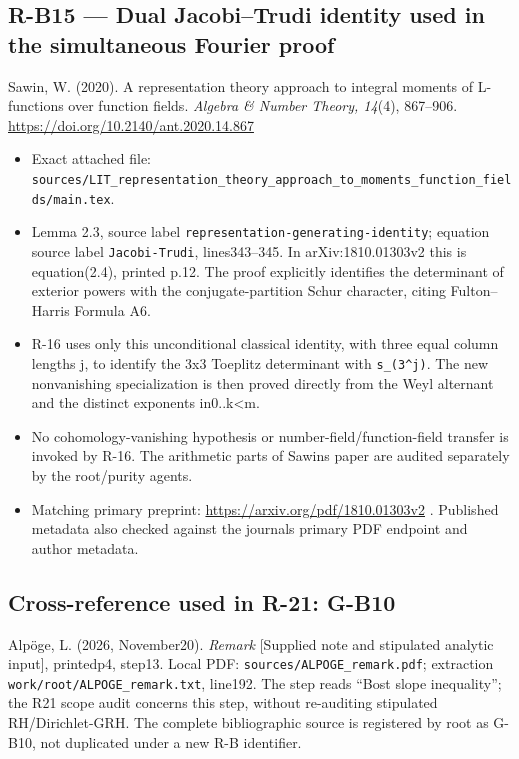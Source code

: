 \documentclass[11pt,a4paper]{article}
\providecommand{\tightlist}{\setlength{\itemsep}{0pt}\setlength{\parskip}{0pt}}
\theoremstyle{definition}\newtheorem{definition}{Definition}
\begin{document}
\subsection{R-B15 --- Dual Jacobi--Trudi identity used in the
simultaneous Fourier
proof}\label{r-b15--dual-jacobitrudi-identity-used-in-the-simultaneous-fourier-proof}

Sawin, W. (2020). A representation theory approach to integral moments
of L-functions over function fields. \emph{Algebra \& Number Theory,
14}(4), 867--906. \url{https://doi.org/10.2140/ant.2020.14.867}

\begin{itemize}
\tightlist
\item
  Exact attached file:
  \nolinkurl{sources/LIT_representation_theory_approach_to_moments_function_fields/main.tex}.
\item
  Lemma 2.3, source label \nolinkurl{representation-generating-identity};
  equation source label \nolinkurl{Jacobi-Trudi}, lines343--345. In
  arXiv:1810.01303v2 this is equation(2.4), printed p.12. The proof
  explicitly identifies the determinant of exterior powers with the
  conjugate-partition Schur character, citing Fulton--Harris Formula A6.
\item
  R-16 uses only this unconditional classical identity, with three equal
  column lengths j, to identify the 3x3 Toeplitz determinant with
  \texttt{s\_(3\^{}j)}. The new nonvanishing specialization is then
  proved directly from the Weyl alternant and the distinct exponents
  in0..k\textless m.
\item
  No cohomology-vanishing hypothesis or number-field/function-field
  transfer is invoked by R-16. The arithmetic parts of
  Sawin\textquotesingle s paper are audited separately by the
  root/purity agents.
\item
  Matching primary preprint: \url{https://arxiv.org/pdf/1810.01303v2} .
  Published metadata also checked against the journal\textquotesingle s
  primary PDF endpoint and author metadata.
\end{itemize}

\subsection{Cross-reference used in R-21:
G-B10}\label{cross-reference-used-in-r-21-g-b10}

Alpöge, L. (2026, November20). \emph{Remark} {[}Supplied note and
stipulated analytic input{]}, printedp4, step13. Local PDF:
\nolinkurl{sources/ALPOGE_remark.pdf}; extraction
\nolinkurl{work/root/ALPOGE_remark.txt}, line192. The step reads ``Bost
slope inequality''; the R21 scope audit concerns this step, without
re-auditing stipulated RH/Dirichlet-GRH. The complete bibliographic
source is registered by root as G-B10, not duplicated under a new R-B
identifier.
\end{document}
